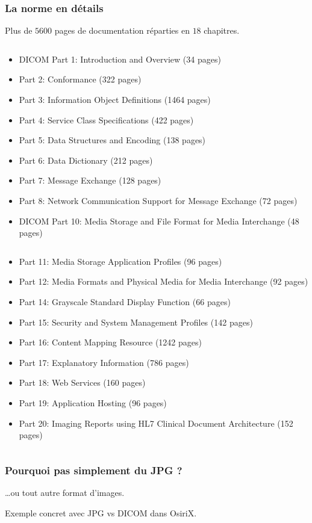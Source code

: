 	\frame
	{
		\frametitle{La norme en d\'etails}
		Plus de $5600$ pages de documentation r\'eparties en $18$ chapitres.
		
		\begin{columns}\begin{scriptsize}
	  	\begin{column}[t]{0.5\linewidth}
			\begin{itemize}
				\item DICOM Part 1: Introduction and Overview (34 pages)
				\item Part 2: Conformance (322 pages)
				\item Part 3: Information Object Definitions (1464 pages)
				\item Part 4: Service Class Specifications (422 pages)
				\item Part 5: Data Structures and Encoding (138 pages)
				\item Part 6: Data Dictionary (212 pages)
				\item Part 7: Message Exchange (128 pages)
				\item Part 8: Network Communication Support for Message Exchange (72 pages)
				\item DICOM Part 10: Media Storage and File Format for Media Interchange (48 pages)
			\end{itemize}
	  	\end{column}
	  	\begin{column}[t]{0.5\linewidth}
			\begin{itemize}
				\item Part 11: Media Storage Application Profiles (96 pages)
				\item Part 12: Media Formats and Physical Media for Media Interchange (92 pages)
				\item Part 14: Grayscale Standard Display Function (66 pages)
				\item Part 15: Security and System Management Profiles (142 pages)
				\item Part 16: Content Mapping Resource (1242 pages)
				\item Part 17: Explanatory Information (786 pages)
				\item Part 18: Web Services (160 pages)
				\item Part 19: Application Hosting (96 pages)
				\item Part 20: Imaging Reports using HL7 Clinical Document Architecture (152 pages)
			\end{itemize}
	  	\end{column}\end{scriptsize}
	  	\end{columns}
	}

	\frame
	{
		\frametitle{Pourquoi pas simplement du JPG ?}
		\ldots ou tout autre format d'images.

		Exemple concret avec JPG vs DICOM dans OsiriX.
	}

